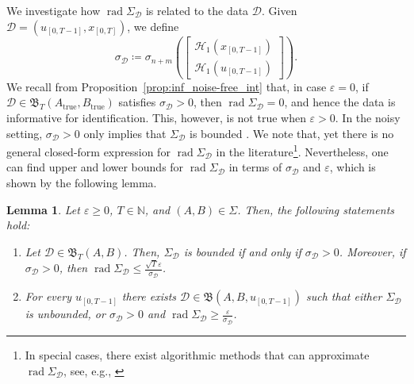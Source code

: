 \documentclass[journal,twoside,web]{ieeecolor}
\DeclareMathOperator{\rad}{rad}
\newtheorem{lemma}[theorem]{Lemma}
\begin{document}
We investigate how $\rad\Sigma_\mathcal{D}$ is related to the data $\mathcal{D}$. Given \mbox{$\mathcal{D}=(u_{[0,T-1]},x_{[0,T]})$}, we define
\begin{equation}
\sigma_\mathcal{D}\coloneqq\sigma_{n+m}\left(\begin{bmatrix}
    \mathcal{H}_1(x_{[0,T-1]}) \\
    \mathcal{H}_1(u_{[0,T-1]})
    \end{bmatrix}\right).
\end{equation}
We recall from Proposition~\ref{prop:inf_noise-free_int} that, in case $\varepsilon=0$, if \mbox{$\mathcal{D}\in\mathfrak{B}_T(A_\text{true},B_\text{true})$} satisfies $\sigma_\mathcal{D}>0$, then $\rad\Sigma_\mathcal{D}=0$, and hence the data is informative for identification. This, however, is not true when $\varepsilon>0$. In the noisy setting, $\sigma_\mathcal{D}>0$ only implies that $\Sigma_\mathcal{D}$ is bounded \cite[Prop. 14(b)]{shakouri2025chebyshev}. We note that, yet there is no general closed-form expression for $\rad\Sigma_\mathcal{D}$ in the literature\footnote{In special cases, there exist algorithmic methods that can approximate $\rad\Sigma_\mathcal{D}$, see, e.g., \cite{beck2007regularization}}. Nevertheless, one can find upper and lower bounds for $\rad\Sigma_\mathcal{D}$ in terms of $\sigma_\mathcal{D}$ and $\varepsilon$, which is shown by the following lemma. 

\begin{lemma}
\label{lem:noisy_rad_lower}
Let $\varepsilon\geq 0$, $T\in\mathbb{N}$, and $(A,B)\in\Sigma$. Then, the following statements hold:
\begin{enumerate}[label=(\alph*),ref=\ref{lem:noisy_rad_lower}(\alph*)]
    \item\label{lem:noisy_rad_lower(a)} Let $\mathcal{D}\in\mathfrak{B}_T(A,B)$. Then, $\Sigma_\mathcal{D}$ is bounded \emph{if and only if} $\sigma_\mathcal{D}>0$. Moreover, if $\sigma_\mathcal{D}>0$, then $\rad\Sigma_\mathcal{D}\leq \frac{\sqrt{T}\varepsilon}{\sigma_\mathcal{D}}$.
    \item\label{lem:noisy_rad_lower(b)} For every $u_{[0,T-1]}$ there exists $\mathcal{D}\in\mathfrak{B}(A,B,u_{[0,T-1]})$ such that either $\Sigma_\mathcal{D}$ is unbounded, or $\sigma_\mathcal{D}>0$ and $\rad\Sigma_\mathcal{D}\geq \frac{\varepsilon}{\sigma_\mathcal{D}}$.
\end{enumerate}
\end{lemma}\vspace{0.1 cm}
\end{document}
